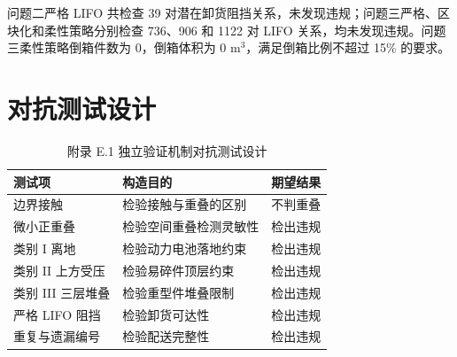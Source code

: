 ﻿\documentclass[UTF8,a4paper,12pt]{ctexart}
\begin{document}
	问题二严格 LIFO 共检查 39 对潜在卸货阻挡关系，未发现违规；问题三严格、区块化和柔性策略分别检查 736、906 和 1122 对 LIFO 关系，均未发现违规。问题三柔性策略倒箱件数为 0，倒箱体积为 0 m$^3$，满足倒箱比例不超过 15\% 的要求。
	
	\section{对抗测试设计}
	
	\begin{table}[H]
		\centering
		\caption{附录 E.1 独立验证机制对抗测试设计}
		\begin{tabular}{p{4.5cm} p{5.5cm} p{3.2cm}}
			\toprule
			测试项 & 构造目的 & 期望结果 \\
			\midrule
			边界接触 & 检验接触与重叠的区别 & 不判重叠 \\
			微小正重叠 & 检验空间重叠检测灵敏性 & 检出违规 \\
			类别 I 离地 & 检验动力电池落地约束 & 检出违规 \\
			类别 II 上方受压 & 检验易碎件顶层约束 & 检出违规 \\
			类别 III 三层堆叠 & 检验重型件堆叠限制 & 检出违规 \\
			严格 LIFO 阻挡 & 检验卸货可达性 & 检出违规 \\
			重复与遗漏编号 & 检验配送完整性 & 检出违规 \\
			\bottomrule
		\end{tabular}
	\end{table}
	
\end{document}
